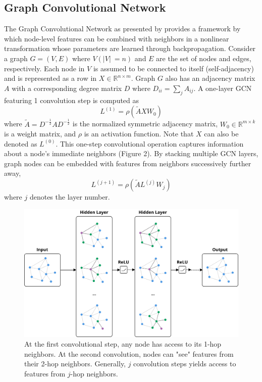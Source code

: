 \documentclass{article}
\begin{document}
\subsection{Graph Convolutional Network}
The Graph Convolutional Network as presented by \cite{kipf2016semisupervised} provides a framework by which node-level features can be combined with neighbors in a nonlinear transformation whose parameters are learned through backpropagation. Consider a graph $G = (V,E)$ where $V(\lvert V\rvert\ = n)$ and $E$ are the set of nodes and edges, respectively. Each node in $V$ is assumed to be connected to itself (self-adjacency) and is represented as a row in $X \in \mathbb{R}^{n \times m}$. Graph $G$ also has an adjacency matrix $A$ with a corresponding degree matrix $D$ where $D_{ii} = \sum_{j}A_{ij}$. A one-layer GCN featuring 1 convolution step is computed as
\begin{equation}
L^{(1)} = \rho(\widetilde{A}XW_{0})
\end{equation}
where $\widetilde{A} = D^{-\frac{1}{2}}AD^{-\frac{1}{2}}$ is the normalized symmetric adjacency matrix, $W_0 \in \mathbb{R}^{m \times k}$ is a weight matrix, and $\rho$ is an activation function. Note that $X$ can also be denoted as $L^{(0)}$. This one-step convolutional operation captures information about a node's immediate neighbors (Figure 2). By stacking multiple GCN layers, graph nodes can be embedded with features from neighbors successively further away,
\begin{equation}
L^{(j+1)} = \rho(\widetilde{A}L^{(j)}W_{j})
\end{equation}
where $j$ denotes the layer number.

\begin{figure}
\centering
\includegraphics[width=.4\linewidth]{gcn_2steps}
\caption{At the first convolutional step, any node has access to its 1-hop neighbors. At the second convolution, nodes can "see" features from their 2-hop neighbors. Generally, $j$ convolution steps yields access to features from $j$-hop neighbors.}
\label{fig: Graph Convolutional Network}
\end{figure}
\end{document}
